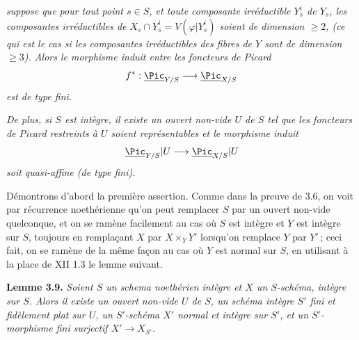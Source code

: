 
\emph{suppose que pour tout point \(s\in S\), et toute composante irr\'eductible \(Y_s^i\) de \(Y_s\), les composantes irr\'eductibles de \(X_s\cap Y_s^i=V(\varphi|Y_s^i)\) soient de dimension \(\ge2\), (ce qui est le cas si les composantes irr\'eductibles des fibres de \(Y\) sont de dimension \(\ge3\)). Alors le morphisme induit entre les foncteurs de Picard}
\[
f^*:\underline{\Pic}_{Y/S}\longrightarrow\underline{\Pic}_{X/S}
\]
\emph{est de type fini.}

\emph{De plus, si \(S\) est int\`egre, il existe un ouvert non-vide \(U\) de \(S\) tel que les foncteurs de Picard restreints \`a \(U\) soient repr\'esentables et le morphisme induit}
\[
\underline{\Pic}_{Y/S}|U\longrightarrow\underline{\Pic}_{X/S}|U
\]
\emph{soit quasi-affine (de type fini).}

D\'emontrons d'abord la premi\`ere assertion. Comme dans la preuve de 3.6, on voit par r\'ecurrence noeth\'erienne qu'on peut remplacer \(S\) par un ouvert non-vide quelconque, et on se ram\`ene facilement au cas o\`u \(S\) est int\`egre et \(Y\) est int\`egre sur \(S\), toujours en rempla\c{c}ant \(X\) par \(X\times_YY'\) lorsqu'on remplace \(Y\) par \(Y'\)\,; ceci fait, on se ram\`ene de la m\^eme fa\c{c}on au cas o\`u \(Y\) est normal sur \(S\), en utilisant \`a la place de XII 1.3 le lemme suivant.

\textbf{Lemme 3.9.} \emph{Soient \(S\) un schema noeth\'erien int\`egre et \(X\) un \(S\)-sch\'ema, int\`egre sur \(S\). Alors il existe un ouvert non-vide \(U\) de \(S\), un sch\'ema int\`egre \(S'\) fini et fid\`element plat sur \(U\), un \(S'\)-sch\'ema \(X'\) normal et int\`egre sur \(S'\), et un \(S'\)-morphisme fini surjectif \(X'\to X_{S'}\).}

